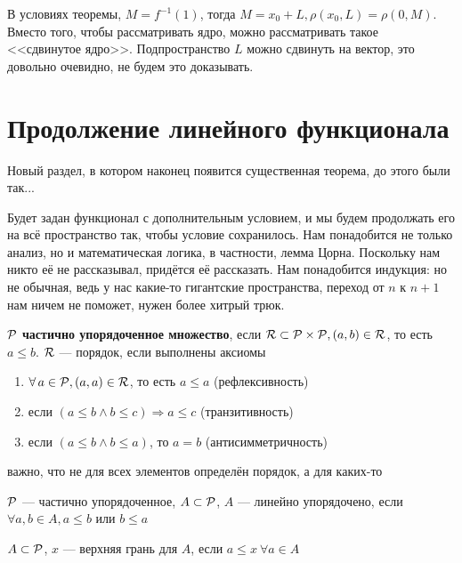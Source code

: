 \documentclass[document]{subfiles}
\begin{document}
\begin{remark}
    В условиях теоремы, $M = f^{-1}(1)$, тогда $M = x_0 + L, \rho(x_0, L) = \rho(0, M)$. Вместо того, чтобы рассматривать ядро, можно рассматривать такое <<сдвинутое ядро>>.
    Подпространство $L$ можно сдвинуть на  вектор, это довольно очевидно, не будем это доказывать.
\end{remark}

\section{Продолжение линейного функционала}

Новый раздел, в котором наконец появится существенная теорема, до этого были так...

Будет задан функционал с дополнительным условием, и мы будем продолжать его на всё пространство так, чтобы условие сохранилось. Нам понадобится не только анализ, но и математическая логика, в частности, лемма Цорна. Поскольку 
нам никто её не рассказывал, придётся её рассказать.
Нам понадобится индукция: но не обычная, ведь у нас какие-то гигантские пространства, переход от $n$ к $n+1$ нам ничем не поможет, нужен более хитрый трюк.

\begin{definition}
    $\mathcal{P}$ \textbf{ частично упорядоченное множество}, если $\mathcal{R} \subset \mathcal{P} \times \mathcal{P}, (a,b) \in \mathcal{R}$, то есть $a \leq b$. $\mathcal{R}$ --- порядок, если выполнены аксиомы 
    \begin{enumerate}
        \item $\forall a \in \Rho, (a,a) \in \R$, то есть $a \leq a$ (рефлексивность)
        \item если $(a \leq b \land b \leq c) \Rightarrow a \leq c$ (транзитивность)
        \item если $(a \leq b \land b \leq a)$, то $a = b$ (антисимметричность)
    \end{enumerate}
    важно, что не для всех элементов определён порядок, а для каких-то
\end{definition}

\begin{definition}
    $\mathcal{P}$ --- частично упорядоченное, $A \subset \mathcal{P}$, $A$ --- линейно упорядочено, если $\forall a,b \in A, a \leq b$ или $b \leq a$
\end{definition}

\begin{definition}
    $A \subset \mathcal{P}$, $x$ --- верхняя грань для $A$, если $a \leq x \: \forall a \in A$
\end{definition}
\end{document}

